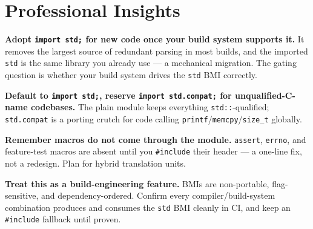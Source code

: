 \section{Professional Insights}

\textbf{Adopt \lstinline|import std;| for new code once your build system supports it.} It removes the largest source of redundant parsing in most builds, and the imported \lstinline|std| is the same library you already use --- a mechanical migration. The gating question is whether your build system drives the \lstinline|std| BMI correctly.

\textbf{Default to \lstinline|import std;|, reserve \lstinline|import std.compat;| for unqualified-C-name codebases.} The plain module keeps everything \lstinline|std::|-qualified; \lstinline|std.compat| is a porting crutch for code calling \lstinline|printf|/\lstinline|memcpy|/\lstinline|size_t| globally.

\textbf{Remember macros do not come through the module.} \lstinline|assert|, \lstinline|errno|, and feature-test macros are absent until you \lstinline|#include| their header --- a one-line fix, not a redesign. Plan for hybrid translation units.

\textbf{Treat this as a build-engineering feature.} BMIs are non-portable, flag-sensitive, and dependency-ordered. Confirm every compiler/build-system combination produces and consumes the \lstinline|std| BMI cleanly in CI, and keep an \lstinline|#include| fallback until proven.
